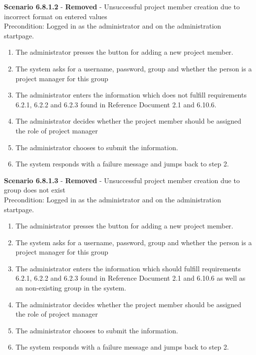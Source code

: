 \documentclass{article}
\begin{document}
\noindent\textbf{Scenario 6.8.1.2} - \textbf{Removed} - Unsuccessful project member creation due to incorrect format on entered values \\
Precondition: Logged in as the administrator and on the administration startpage.
\begin{enumerate}
\item The administrator presses the button for adding a new project member.
\item The system asks for a username, password, group and whether the person is a project manager for this group
\item The administrator enters the information which does not fulfill requirements 6.2.1, 6.2.2 and 6.2.3 found in Reference Document 2.1 and 6.10.6.
\item The administrator decides whether the project member should be assigned the role of project manager
\item The administrator chooses to submit the information.
\item The system responds with a failure message and jumps back to step 2.
\end{enumerate}

\noindent\textbf{Scenario 6.8.1.3} - \textbf{Removed} - Unsuccessful project member creation due to group does not exist  \\
Precondition: Logged in as the administrator and on the administration startpage.
\begin{enumerate}
\item The administrator presses the button for adding a new project member.
\item The system asks for a username, password, group and whether the person is a project manager for this group
\item The administrator enters the information which should fulfill requirements 6.2.1, 6.2.2 and 6.2.3 found in Reference Document 2.1 and 6.10.6 as well as an non-existing group in the system.
\item The administrator decides whether the project member should be assigned the role of project manager
\item The administrator chooses to submit the information.
\item The system responds with a failure message and jumps back to step 2.
\end{enumerate}
\end{document}
